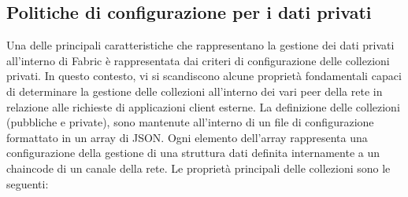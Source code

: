 \subsection{Politiche di configurazione per i dati privati}
Una delle principali caratteristiche che rappresentano la gestione dei dati privati all'interno di Fabric è rappresentata dai criteri di configurazione delle collezioni privati. In questo contesto, vi si scandiscono alcune proprietà fondamentali capaci di determinare la gestione delle collezioni all'interno dei vari peer della rete in relazione alle richieste di applicazioni client esterne.
La definizione delle collezioni (pubbliche e private), sono mantenute all'interno di un file di configurazione formattato in un array di JSON. Ogni elemento dell'array rappresenta una configurazione della gestione di una struttura dati definita internamente a un chaincode di un canale della rete.
Le proprietà principali delle collezioni sono le seguenti:
